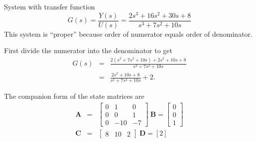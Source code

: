 \begin{slide}
System with transfer function
\[G(s)=\frac{Y(s)}{U(s)}=\frac{2s^3 + 16s^2 + 30s + 8}{s^3 + 7s^2 + 10s}\]
This system is ``proper'' because order of numerator equals order of denominator.
\end{slide}
\begin{slide}
First divide the numerator into the denominator to get
\begin{eqnarray*}G(s)&=&\frac{2(s^3 + 7s^2 + 10s) + 2s^2 + 10s + 8}{s^3 + 7s^2 +
10s}\\ &=& \frac{2s^2 + 10s + 8}{s^3 + 7s^2 + 10s} +
2.\end{eqnarray*} 
\end{slide}
\begin{slide}
The companion form of the state matrices are
\begin{eqnarray*}\mathbf{A} & = & \left[\begin{array}{ccc}
  0 & 1 & 0 \\
  0 & 0 & 1 \\
  0 & -10 & -7
\end{array}\right]\ \mathbf{B}=\left[\begin{array}{c}
  0 \\
  0 \\
  1
\end{array}\right]\\ \mathbf{C} & = & \left[\begin{array}{ccc}
  8 & 10 & 2
\end{array}\right]\ \mathbf{D}=\left[2\right]\end{eqnarray*}
\end{slide}



\endinput


